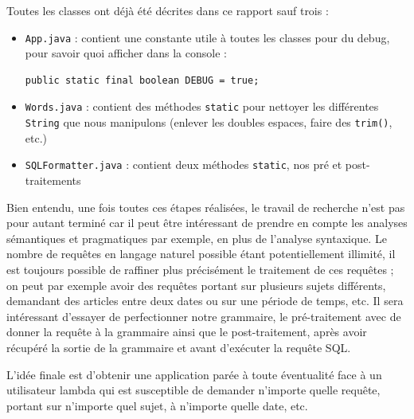 Toutes les classes ont déjà été décrites dans ce rapport sauf trois :

\begin{itemize}
  \item \lstinline{App.java} : contient une constante utile à toutes les classes pour du debug, pour savoir quoi afficher dans la console :
      \java
        \begin{lstlisting}
public static final boolean DEBUG = true;
        \end{lstlisting}
  \item \lstinline{Words.java} : contient des méthodes \lstinline{static} pour nettoyer les différentes \lstinline{String} que nous manipulons (enlever les doubles espaces, faire des \lstinline{trim()}, etc.)
  \item \lstinline{SQLFormatter.java} : contient deux méthodes \lstinline{static}, nos pré et post-traitements
\end{itemize}

\medskip

Bien entendu, une fois toutes ces étapes réalisées, le travail de recherche n'est pas pour autant terminé car il peut être intéressant de prendre en compte les analyses sémantiques et pragmatiques par exemple, en plus de l'analyse syntaxique. Le nombre de requêtes en langage naturel possible étant potentiellement illimité, il est toujours possible de raffiner plus précisément le traitement de ces requêtes ; on peut par exemple avoir des requêtes portant sur plusieurs sujets différents, demandant des articles entre deux dates ou sur une période de temps, etc. Il sera intéressant d'essayer de perfectionner notre grammaire, le pré-traitement avec de donner la requête à la grammaire ainsi que le post-traitement, après avoir récupéré la sortie de la grammaire et avant d'exécuter la requête SQL.

\medskip

L'idée finale est d'obtenir une application parée à toute éventualité face à un utilisateur lambda qui est susceptible de demander n'importe quelle requête, portant sur n'importe quel sujet, à n'importe quelle date, etc.

